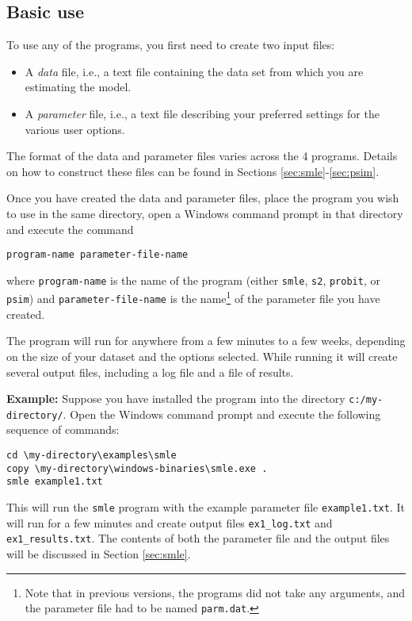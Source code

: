 \documentclass{article}
\begin{document}
\subsection{Basic use}

To use any of the programs, you first need to create two input files:
\begin{itemize}
	\item A {\it data} file, i.e., a text file containing the 
		data set from which you are estimating the model.
	\item A {\it parameter} file, i.e., a text file describing
		your preferred settings for the various user options.  
\end{itemize}
The format of the data and parameter files varies across the 4 programs.
Details on how to construct these files can be found in Sections \ref{sec:smle}-\ref{sec:psim}.

Once you have created the data and parameter files, place the program you wish
to use in the same directory, open a Windows command prompt in that directory
and execute the command \\
\begin{center}
{\tt program-name parameter-file-name}
\end{center}
where
{\tt program-name} is the name of the program (either {\tt smle}, {\tt s2},
{\tt probit}, or {\tt psim}) and {\tt parameter-file-name} is the name\footnote{Note that
in previous versions, the programs did not take any arguments, and the parameter file 
had to be named {\tt parm.dat}.} of the parameter file you have created.

The program will run for anywhere from a few minutes to a few weeks,
depending on the size of your dataset and the options selected.
While running it will create several output files, including 
a log file and a file of results.

{\bf Example:} Suppose you have installed the program into
the directory {\tt c:/my-directory/}.  Open the Windows
command prompt and execute the following sequence of 
commands:
\begin{verbatim}
cd \my-directory\examples\smle
copy \my-directory\windows-binaries\smle.exe .
smle example1.txt
\end{verbatim}
This will run the {\tt smle} program with the example parameter file
{\tt example1.txt}.  It will run for a few minutes and 
create output files {\tt ex1\_log.txt} and {\tt ex1\_results.txt}.
The contents of both the parameter file and the output files
will be discussed in Section \ref{sec:smle}.
\end{document}
